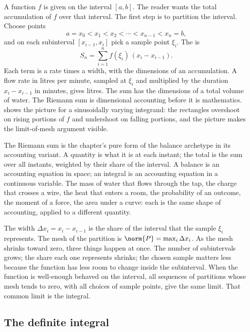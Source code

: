 A function $f$ is given on the interval $[a,b]$. The reader wants the
total accumulation of $f$ over that interval. The first step is to
partition the interval. Choose points
\[
a = x_{0} < x_{1} < x_{2} < \cdots < x_{n-1} < x_{n} = b,
\]
and on each subinterval $[x_{i-1}, x_{i}]$ pick a sample point
$\xi_{i}$. The  is
\[
S_{n} = \sum_{i=1}^{n} f(\xi_{i})\,(x_{i} - x_{i-1}).
\]
Each term is a rate times a width, with the dimensions of an
accumulation. A flow rate in litres per minute, sampled at $\xi_{i}$
and multiplied by the duration $x_{i}-x_{i-1}$ in minutes, gives
litres. The sum has the dimensions of a total volume of water. The
Riemann sum is dimensional accounting before it is mathematics.
 shows the picture for a
sinusoidally varying integrand: the rectangles overshoot on rising
portions of $f$ and undershoot on falling portions, and the picture
makes the limit-of-mesh argument visible.



\begin{archetype}
The Riemann sum is the chapter's pure form of the balance archetype
in its accounting variant. A quantity is what it is at each instant;
the total is the sum over all instants, weighted by their share of
the interval. A balance is an accounting equation in space; an
integral is an accounting equation in a continuous variable. The
mass of water that flows through the tap, the charge that crosses a
wire, the heat that enters a room, the probability of an outcome,
the moment of a force, the area under a curve: each is the same
shape of accounting, applied to a different quantity.
\end{archetype}

The width $\Delta x_{i} = x_{i} - x_{i-1}$ is the share of the
interval that the sample $\xi_{i}$ represents. The mesh of the
partition is $\norm{P} = \max_{i} \Delta x_{i}$. As the mesh shrinks
toward zero, three things happen at once. The number of subintervals
grows; the share each one represents shrinks; the chosen sample
matters less because the function has less room to change inside the
subinterval. When the function is well-enough behaved on the
interval, all sequences of partitions whose mesh tends to zero, with
all choices of sample points, give the same limit. That common limit
is the integral.

\subsection{The definite integral}

